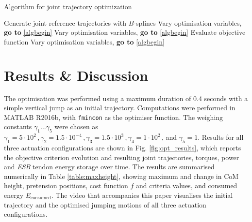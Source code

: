 \documentclass[letterpaper, 10 pt, conference]{ieeeconf}  %
\begin{document}
\begin{algorithm}[ht]
	\caption{Algorithm for joint trajectory optimization} \label{algo}
	\begin{algorithmic}[1]
		\STATE Generate joint reference trajectories with $B$-splines \label{algbegin}
		\ELSE
			\STATE Vary optimisation variables, \textbf{go to} \ref{algbegin}
		\ENDIF
		\ENDWHILE
		\ELSE
			\STATE Vary optimisation variables, \textbf{go to} \ref{algbegin}
		\ENDIF
		\STATE Evaluate objective function
		\ELSE
			\STATE Vary optimisation variables, \textbf{go to} \ref{algbegin}
		\ENDIF
	\end{algorithmic}
\end{algorithm}


\section{Results \& Discussion} \label{sec:results}
The optimisation was performed using a maximum duration of 0.4 seconds with a simple vertical jump as an initial trajectory. Computations were performed in MATLAB R2016b, with \texttt{fmincon} as the optimiser function. The weighing constants $\gamma_1 \dots \gamma_5$ were chosen as $\gamma_1=5 \cdot 10^{2} \,, \gamma_2=1.5 \cdot 10^{-4} \,, \gamma_3=1.5 \cdot 10^{3} \,, \gamma_4 = 1\cdot 10^{2}\,$, and $\gamma_5 = 1$. Results for all three actuation configurations are shown in Fig. \ref{fig:opt_results}, which reports the objective criterion evolution and resulting joint trajectories, torques, power and \textit{ESB} tendon energy storage over time. The results are summarised numerically in Table \ref{table:maxheight}, showing maximum and change in CoM height, pretension positions, cost function $f$ and criteria values, and consumed energy $E_{\text{consumed}}$. The video that accompanies this paper visualises the initial trajectory and the optimised jumping motions of all three actuation configurations.

\end{document}
